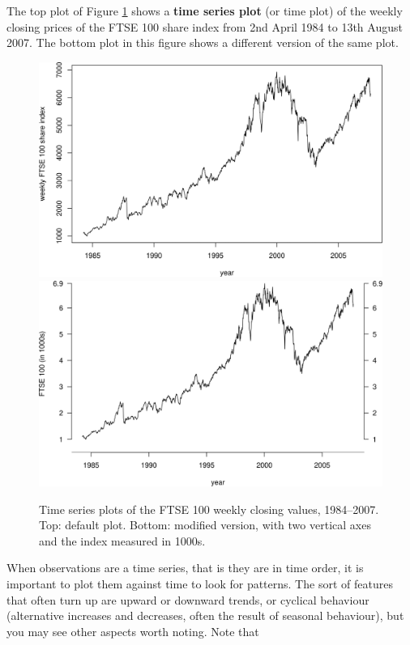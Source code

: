 \documentclass[
  british,
]{book}
\begin{document}
The top plot of Figure \ref{fig:ftsenew} shows a \textbf{time series plot} (or time plot) of the weekly closing prices of the FTSE 100 share index from 2nd April 1984 to 13th August 2007. The bottom plot in this figure shows a different version of the same plot.

\begin{figure}

{\centering \includegraphics[width=0.8\linewidth]{images/ftse_weekly} \includegraphics[width=0.8\linewidth]{images/ftse_weekly_tufte} 

}

\caption{Time series plots of the FTSE 100 weekly closing values, 1984--2007.  Top: default plot.  Bottom: modified version, with two vertical axes and the index measured in 1000s.}\label{fig:ftsenew}
\end{figure}
\FloatBarrier

When observations are a time series, that is they are in time order, it is important to plot them against time to look for patterns. The sort of features that often turn up are upward or downward trends, or cyclical behaviour (alternative increases and decreases, often the result of seasonal behaviour),
but you may see other aspects worth noting. Note that
\end{document}
